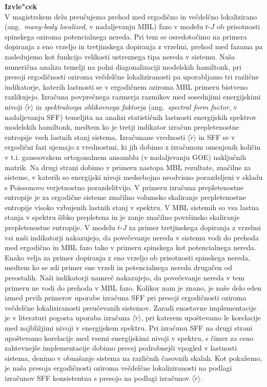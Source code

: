 \cleardoublepage
{\Large \bf Izvle"cek}
\vspace{1cm}\\
V magistrskem delu preučujemo prehod med ergodično in večdelčno lokalizirano (ang.~\emph{many-body localized}, v nadaljevanju MBL) fazo v modelu $t$-$J$ ob prisotnosti spinskega oziroma potencialnega nereda. Pri tem se osredotočimo na primera dopiranja z eno vrzeljo in tretjinskega dopiranja z vrzelmi, prehod med fazama pa zasledujemo kot funkcijo velikosti ustreznega tipa nereda v sistemu. Naša numerična analiza temelji na polni diagonalizaciji modelskih hamiltonk, pri presoji ergodičnosti oziroma večdelčne lokaliziranosti pa uporabljamo tri različne indikatorje, katerih lastnosti se v ergodičnem oziroma MBL primeru bistveno razlikujejo. Izračuna povprečnega razmerja razmikov med sosednjimi energijskimi nivoji $\langle \tilde{r}\rangle$ in \emph{spektralnega oblikovnega faktorja} (ang.~\emph{spectral form factor}, v nadaljevanju SFF) temeljita na analizi statističnih lastnosti energijskih spektrov modelskih hamiltonk, medtem ko je tretji indikator izračun prepletenostne entropije vseh lastnih stanj sistema. 
  Izračunane vrednosti $\langle\tilde{r}\rangle$ in SFF se  v ergodični fazi ujemajo z vrednostmi, ki jih dobimo z izračunom omenjenih količin v t.i. gaussovskem ortogonalnem ansamblu (v nadaljevanju GOE) naključnih matrik. Na drugi strani dobimo v primeru nastopa MBL rezultate, značilne za sisteme, v katerih so energijski nivoji medsebojno neodvisno porazdeljeni v skladu s Poissonovo verjetnostno porazdelitvijo. V primeru izračuna prepletenostne entropije je za ergodične sisteme značilno volumsko skaliranje prepletenostne entropije visoko vzbujenih lastnih stanj v spektru. V MBL sistemih so vsa lastna stanja v spektru šibko prepletena in je zanje značilno površinsko skaliranje prepletenostne entropije. V modelu $t$-$J$ za primer tretjinskega dopiranja z vrzelmi vsi naši indikatorji nakazujejo, da povečevanje nereda v sistemu vodi do prehoda med ergodično in MBL fazo tako v primeru spinskega kot potencialnega nereda. Enako velja za primer dopiranja z eno vrzeljo ob prisotnosti spinskega nereda, medtem ko se zdi primer ene vrzeli in potencialnega nereda drugačen od preostalih. Naši indikatorji namreč nakazujejo, da povečevanje nereda v tem primeru ne vodi do prehoda v MBL fazo. Kolikor nam je znano, je naše delo eden izmed prvih primerov uporabe izračuna SFF pri presoji ergodičnosti oziroma večdelčne lokaliziranosti preučevanih sistemov. Zaradi enostavne implementacije je v literaturi pogosta uporaba izračuna $\langle\tilde{r}\rangle$, pri katerem upoštevamo le korelacije med najbližjimi nivoji v energijskem spektru. Pri izračunu SFF na drugi strani upoštevamo korelacije med vsemi energijskimi nivoji v spektru, s čimer za ceno zahtevnejše implementacije dobimo precej podrobnejši vpogled v lastnosti sistema, denimo v obnašanje sistema na različnih časovnih skalah. Kot pokažemo, je naša presoja ergodičnosti oziroma večdelčne lokaliziranosti na podlagi izračunov SFF konsistentna s presojo na podlagi izračunov $\langle\tilde{r}\rangle$.
